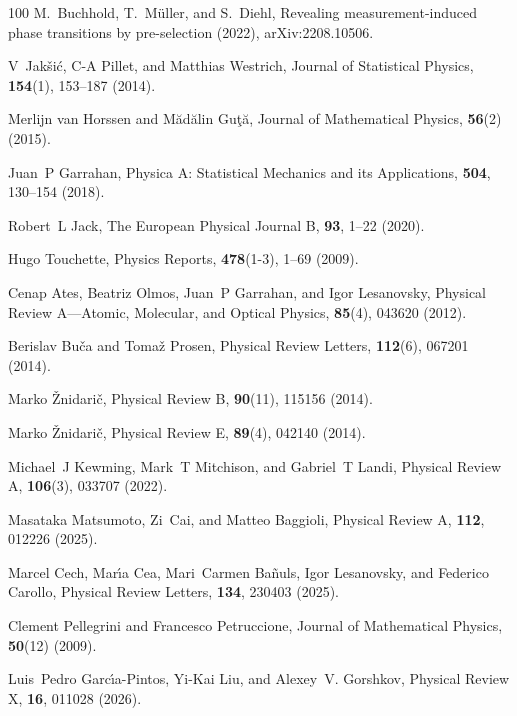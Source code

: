 \documentclass[preprint,pteplogo]{ptephy_v2}%
\numberwithin{equation}{section}
\theoremstyle{definition}
\begin{document}
\begin{thebibliography}{100}
M.~Buchhold, T.~Müller, and S.~Diehl,
\newblock Revealing measurement-induced phase transitions by pre-selection (2022),  {{arXiv:2208.10506}}.

V~Jak{\v{s}}i{\'c}, C-A Pillet, and Matthias Westrich, Journal of Statistical Physics, {\bf 154}(1), 153--187 (2014).

Merlijn van Horssen and M{\u{a}}d{\u{a}}lin Gu{\c{t}}{\u{a}}, Journal of Mathematical Physics, {\bf 56}(2) (2015).

Juan~P Garrahan, Physica A: Statistical Mechanics and its Applications, {\bf 504}, 130--154 (2018).

Robert~L Jack, The European Physical Journal B, {\bf 93}, 1--22 (2020).

Hugo Touchette, Physics Reports, {\bf 478}(1-3), 1--69 (2009).

Cenap Ates, Beatriz Olmos, Juan~P Garrahan, and Igor Lesanovsky, Physical Review A—Atomic, Molecular, and Optical Physics, {\bf 85}(4), 043620 (2012).

Berislav Bu{\v{c}}a and Toma{\v{z}} Prosen, Physical Review Letters, {\bf 112}(6), 067201 (2014).

Marko {\v{Z}}nidari{\v{c}}, Physical Review B, {\bf 90}(11), 115156 (2014).

Marko {\v{Z}}nidari{\v{c}}, Physical Review E, {\bf 89}(4), 042140 (2014).

Michael~J Kewming, Mark~T Mitchison, and Gabriel~T Landi, Physical Review A, {\bf 106}(3), 033707 (2022).

Masataka Matsumoto, Zi~Cai, and Matteo Baggioli, Physical Review A, {\bf 112}, 012226 (2025).

Marcel Cech, Mar\'{\i}a Cea, Mari~Carmen Ba\~nuls, Igor Lesanovsky, and Federico Carollo, Physical Review Letters, {\bf 134}, 230403 (2025).

Clement Pellegrini and Francesco Petruccione, Journal of Mathematical Physics, {\bf 50}(12) (2009).

Luis~Pedro Garc\'{\i}a-Pintos, Yi-Kai Liu, and Alexey~V. Gorshkov, Physical Review X, {\bf 16}, 011028 (2026).


\end{thebibliography}
\end{document}
